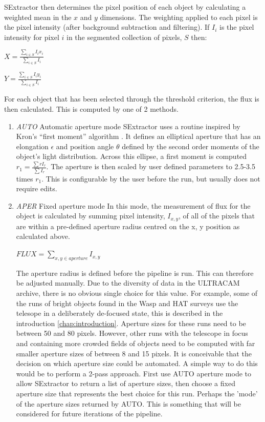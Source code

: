 SExtractor then determines the pixel position of each object by calculating a weighted mean in the $x$ and $y$ dimensions. The weighting applied to each pixel is the pixel intensity (after background subtraction and filtering). If $I_{i}$ is the pixel intensity for pixel $i$ in the segmented collection of pixels, $S$ then:

$ X = \frac{\sum\limits_{i \in S} I_{i}x_{i}}{\sum\limits_{i \in S} I_i}$

$ Y = \frac{\sum\limits_{i \in S} I_{i}y_{i}}{\sum\limits_{i \in S} I_i}$

For each object that has been selected through the threshold criterion, the flux is then calculated. This is computed by one of 2 methods. 

\begin{enumerate}
  \item \emph{AUTO} Automatic aperture mode
SExtractor uses a routine inspired by Kron's ``first moment'' algorithm \cite{kron}. It defines an elliptical aperture that has an elongation $\epsilon$ and position angle $\theta$ defined by the second order moments of the object's light distribution. Across this ellipse, a first moment is computed $r_1 = \frac{\sum r I_r}{\sum{I_r}}$. The aperture is then scaled by user defined parameters to 2.5-3.5 times $r_1$. This is configurable by the user before the run, but usually does not require edits. 

  \item \emph{APER} Fixed aperture mode 
In this mode, the measurement of flux for the object is calculated by summing pixel intensity, $I_{x,y}$,  of all of the pixels that are within a pre-defined aperture radius centred on the x, y position as calculated above. 

$FLUX = \sum\limits_{x,y \in aperture}I_{x,y} $

The aperture radius is defined before the pipeline is run. This can therefore be adjusted manually. Due to the diversity of data in the ULTRACAM archive, there is no obvious single choice for this value. For example, some of the runs of bright objects found in the Wasp and HAT surveys use the telesope in a deliberately de-focused state, this is described in the introduction \ref{chap:introduction}. Aperture sizes for these runs need to be between 50 and 80 pixels. However, other runs with the telescope in focus and containing more crowded fields of objects need to be computed with far smaller aperture sizes of between 8 and 15 pixels. It is conceivable that the decision on which aperture size could be automated. A simple way to do this would be to perform a 2-pass approach. First use AUTO aperture mode to allow SExtractor to return a list of aperture sizes, then choose a fixed aperture size that represents the best choice for this run. Perhaps the 'mode' of the aperture sizes returned by AUTO. This is something that will be considered for future iterations of the pipeline. 


\end{enumerate}
